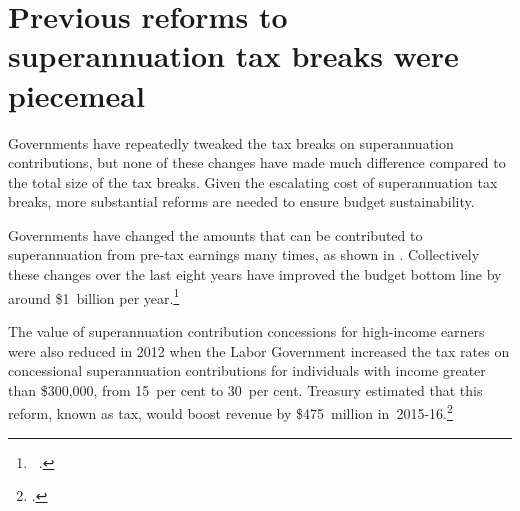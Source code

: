 \section{Previous reforms to superannuation tax breaks were piecemeal}\label{sec:SUPER-3-8}
Governments have repeatedly tweaked the tax breaks on superannuation contributions, but none of these changes have made much difference compared to the total size of the tax breaks. Given the escalating cost of superannuation tax breaks, more substantial reforms are needed to ensure budget sustainability. 

Governments have changed the amounts that can be contributed to superannuation from pre-tax earnings many times, as shown in . Collectively these changes over the last eight years have improved the budget bottom line by around \$1~billion per year.\footnote{\gao\ \textcite{TreasurymultipleyearsBudgetPapers200809to201516}.}  

The value of superannuation contribution concessions for high-income earners were also reduced in 2012 when the Labor Government increased the tax rates on concessional superannuation contributions for individuals with income greater than \$300,000, from 15~per cent to 30~per cent. Treasury estimated that this reform, known as  tax, would boost revenue by \$475~million in~2015-16.\footcite[][41]{Treasury2012} 

